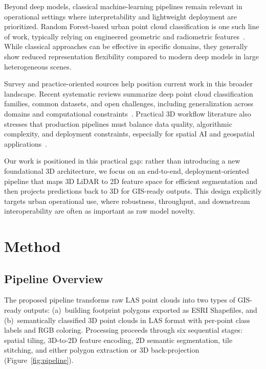 \documentclass[11pt]{article}
\begin{document}
Beyond deep models, classical machine-learning pipelines remain relevant in operational settings where interpretability and lightweight deployment are prioritized.
Random Forest-based urban point cloud classification is one such line of work, typically relying on engineered geometric and radiometric features~\cite{alfio2024randomforesturban}.
While classical approaches can be effective in specific domains, they generally show reduced representation flexibility compared to modern deep models in large heterogeneous scenes.

Survey and practice-oriented sources help position current work in this broader landscape.
Recent systematic reviews summarize deep point cloud classification families, common datasets, and open challenges, including generalization across domains and computational constraints~\cite{zhang2023survey3dclassification}.
Practical 3D workflow literature also stresses that production pipelines must balance data quality, algorithmic complexity, and deployment constraints, especially for spatial AI and geospatial applications~\cite{poux2025data3dscience}.

Our work is positioned in this practical gap: rather than introducing a new foundational 3D architecture, we focus on an end-to-end, deployment-oriented pipeline that maps 3D LiDAR to 2D feature space for efficient segmentation and then projects predictions back to 3D for GIS-ready outputs.
This design explicitly targets urban operational use, where robustness, throughput, and downstream interoperability are often as important as raw model novelty.

\section{Method}
\label{sec:method}

\subsection{Pipeline Overview}
\label{sec:method_overview}

The proposed pipeline transforms raw LAS point clouds into two types of GIS-ready outputs: (a)~building footprint polygons exported as ESRI Shapefiles, and (b)~semantically classified 3D point clouds in LAS format with per-point class labels and RGB coloring.
Processing proceeds through six sequential stages: spatial tiling, 3D-to-2D feature encoding, 2D semantic segmentation, tile stitching, and either polygon extraction or 3D back-projection (Figure~\ref{fig:pipeline}).
\end{document}
